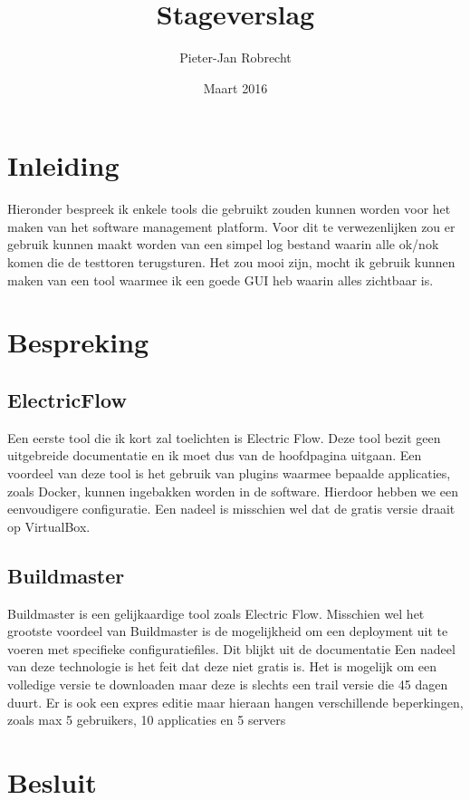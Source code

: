 \documentclass{article}
\title{Stageverslag}
\author{\mbox{Pieter-Jan} Robrecht}
\date{Maart 2016}
\begin{document}


\clearpage
\setcounter{page}{1}

\tableofcontents
\lstlistoflistings
\clearpage

\section{Inleiding}
Hieronder bespreek ik enkele tools die gebruikt zouden kunnen worden voor het maken van het software management platform.\citep{thread309256}
Voor dit te verwezenlijken zou er gebruik kunnen maakt worden van een simpel log bestand waarin alle ok/nok komen die de testtoren terugsturen.
Het zou mooi zijn, mocht ik gebruik kunnen maken van een tool waarmee ik een goede GUI heb waarin alles zichtbaar is.

\section{Bespreking}
\subsection{ElectricFlow \citep{electricMain}}
Een eerste tool die ik kort zal toelichten is Electric Flow.
Deze tool bezit geen uitgebreide documentatie en ik moet dus van de hoofdpagina uitgaan.
Een voordeel van deze tool is het gebruik van plugins waarmee bepaalde applicaties, zoals Docker, kunnen ingebakken worden in de software.
Hierdoor hebben we een eenvoudigere configuratie.
Een nadeel is misschien wel dat de gratis versie draait op VirtualBox.

\subsection{Buildmaster \citep{buildmasterMain}}
Buildmaster is een gelijkaardige tool zoals Electric Flow. 
Misschien wel het grootste voordeel van Buildmaster is de mogelijkheid om een deployment uit te voeren met specifieke configuratiefiles.
Dit blijkt uit de documentatie \citep{buildmasterDoc}
Een nadeel van deze technologie is het feit dat deze niet gratis is.
Het is mogelijk om een volledige versie te downloaden maar deze is slechts een trail versie die 45 dagen duurt.
Er is ook een expres editie maar hieraan hangen verschillende beperkingen, zoals max 5 gebruikers, 10 applicaties en 5 servers \citep{buildmasterPricing}

\section{Besluit}

%

%


\end{document}
